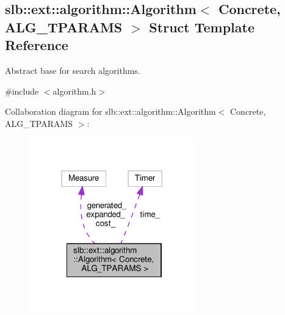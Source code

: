 \hypertarget{structslb_1_1ext_1_1algorithm_1_1Algorithm}{}\subsection{slb\+:\+:ext\+:\+:algorithm\+:\+:Algorithm$<$ Concrete, A\+L\+G\+\_\+\+T\+P\+A\+R\+A\+MS $>$ Struct Template Reference}
\label{structslb_1_1ext_1_1algorithm_1_1Algorithm}


Abstract base for search algorithms.  




{\ttfamily \#include $<$algorithm.\+h$>$}



Collaboration diagram for slb\+:\+:ext\+:\+:algorithm\+:\+:Algorithm$<$ Concrete, A\+L\+G\+\_\+\+T\+P\+A\+R\+A\+MS $>$\+:\nopagebreak
\begin{figure}[H]
\begin{center}
\leavevmode
\includegraphics[width=203pt]{structslb_1_1ext_1_1algorithm_1_1Algorithm__coll__graph}
\end{center}
\end{figure}
